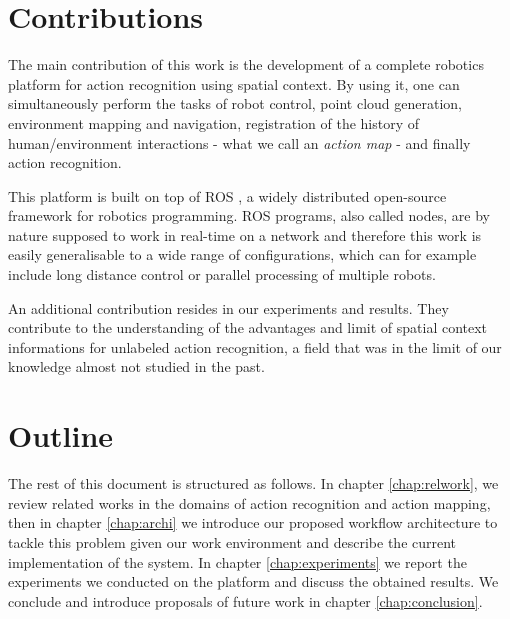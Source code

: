 \section{Contributions}
The main contribution of this work is the development of a complete robotics platform for action recognition using spatial context. By using it, one can simultaneously perform the tasks of robot control, point cloud generation, environment mapping and navigation, registration of the history of human/environment interactions - what we call an \emph{action map} - and finally action recognition.

This platform is built on top of ROS \cite{ROS}, a widely distributed open-source framework for robotics programming. ROS programs, also called nodes, are by nature supposed to work in real-time on a network and therefore this work is easily generalisable to a wide range of configurations, which can for example include long distance control or parallel processing of multiple robots.

An additional contribution resides in our experiments and results. They contribute to the understanding of the advantages and limit of spatial context informations for unlabeled action recognition, a field that was in the limit of our knowledge almost not studied in the past. 

\section{Outline}
The rest of this document is structured as follows. In chapter \ref{chap:relwork}, we review related works in the domains of action recognition and action mapping, then in chapter \ref{chap:archi} we introduce our proposed workflow architecture to tackle this problem given our work environment and describe the current implementation of the system. In chapter \ref{chap:experiments} we report the experiments we conducted on the platform and discuss the obtained results. We conclude and introduce proposals of future work in chapter \ref{chap:conclusion}. 